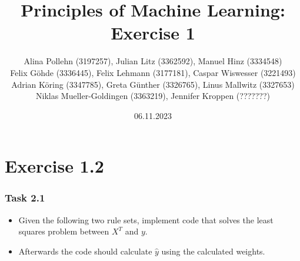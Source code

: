 \documentclass[10pt,aspectratio=169,handout]{beamer}
\begin{document}
\title{Principles of Machine Learning: Exercise 1}
\date{06.11.2023}
\author{Alina Pollehn (3197257), Julian Litz (3362592), Manuel Hinz (3334548)\\
    Felix Göhde (3336445), Felix Lehmann (3177181), Caspar Wiswesser (3221493)\\
    Adrian Köring (3347785), Greta Günther (3326765), Linus Mallwitz (3327653)\\
    Niklas Mueller-Goldingen (3363219), Jennifer Kroppen (???????)}

\begin{frame}
    \maketitle
\end{frame}

\section{Exercise 1.2}


\begin{frame}
    \frametitle{Task 2.1}
    \begin{itemize}
        \item Given the following two rule sets, implement code that solves the least squares problem between $X^T$ and $y$.
        \item Afterwards the code should calculate $\hat{y}$ using the calculated weights.
    \end{itemize}
\end{frame}
\end{document}
